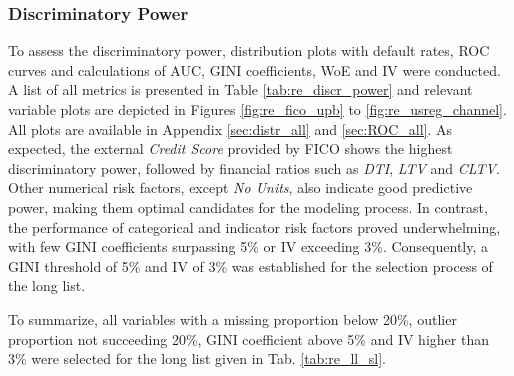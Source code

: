 \subsubsection{Discriminatory Power}
To assess the discriminatory power, distribution plots with default rates, ROC curves and calculations of AUC, GINI coefficients, WoE and IV were conducted. A list of all metrics is presented in Table \ref{tab:re_discr_power} and relevant variable plots are depicted in Figures \ref{fig:re_fico_upb} to \ref{fig:re_usreg_channel}. All plots are available in Appendix \ref{sec:distr_all} and \ref{sec:ROC_all}. As expected, the external \emph{Credit Score} provided by FICO shows the highest discriminatory power, followed by financial ratios such as \emph{DTI}, \emph{LTV} and \emph{CLTV}. Other numerical risk factors, except \emph{No Units}, also indicate good predictive power, making them optimal candidates for the modeling process. In contrast,  the performance of categorical and indicator risk factors proved underwhelming, with few GINI coefficients surpassing 5\% or IV exceeding 3\%. Consequently, a GINI threshold of 5\% and IV of 3\% was established for the selection process of the long list.

To summarize, all variables with a missing proportion below 20\%, outlier proportion not succeeding 20\%, GINI coefficient above 5\% and IV higher than 3\% were selected for the long list given in Tab. \ref{tab:re_ll_sl}. 

\newpage

